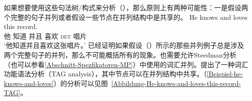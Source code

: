 \begin{exe}
\begin{xlist}[iv.]
\begin{exe}
\begin{xlist}[iv.]
如果想要使用这些句法树/构式来分析（），那么原则上有两种可能性：一是假设两个完整的句子并列或者假设一些节点在并列结构中是共享的。
\ea
\label{Beispiel-he-knows-and-loves}
\gll He knows and loves this record.\\
     他 知道 并且 喜欢 \textsc{det} 唱片\\
\glt `他知道并且喜欢这张唱片。'
\z
%
%
%
\citet{Abeille2006a}已经证明如果假设（）所示的那些并列例子总是涉及两个完整句子的并列，那么不可能概括所有的现象。也需要允许Steedman分析（也可以参看\ref{Abschnitt-Spezfikatoren-MP}）中使用的词汇并列。\citet{SJ96a}提出了一种词汇功能语法分析\indextagc（TAG analysis），其中节点可以在并列结构中共享。（\ref{Beispiel-he-knows-and-loves}）的分析可以见图~\vref{Abbildung-He-knows-and-loves-this-record-TAG}。

\end{xlist}
\end{exe}
\end{xlist}
\end{exe}
